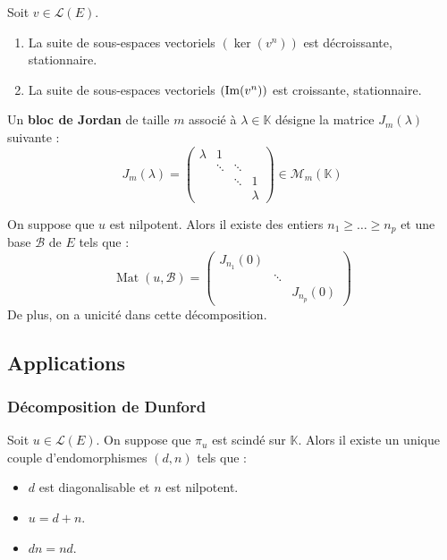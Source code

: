  \begin{proposition}
    Soit $v \in \mathcal{L}(E)$.
    \begin{enumerate}[label={\bfseries(\roman*)}]
      \item La suite de sous-espaces vectoriels $(\ker(v^n))$ est décroissante, stationnaire.
      \item La suite de sous-espaces vectoriels $(\mathrm{Im}(v^n))$ est croissante, stationnaire.
    \end{enumerate}
  \end{proposition}


  \begin{definition}
    Un \textbf{bloc de Jordan} de taille $m$ associé à $\lambda \in \mathbb{K}$ désigne la matrice $J_m(\lambda)$ suivante :
    \[ J_m(\lambda) = \begin{pmatrix} \lambda & 1 & \\ & \ddots & \ddots & \\ & & \ddots & 1 \\ & & & \lambda \end{pmatrix} \in \mathcal{M}_m(\mathbb{K}) \]
  \end{definition}

  \begin{application}
    On suppose que $u$ est nilpotent. Alors il existe des entiers $n_1 \geq \dots \geq n_p$ et une base $\mathcal{B}$ de $E$ tels que :
    \[ \operatorname{Mat}(u, \mathcal{B}) = \begin{pmatrix} J_{n_1}(0) & & \\ & \ddots & \\ & & J_{n_p}(0) \end{pmatrix} \]
    De plus, on a unicité dans cette décomposition.
  \end{application}

  \subsection{Applications}

  \subsubsection{Décomposition de Dunford}


  \begin{theorem}
    Soit $u \in \mathcal{L}(E)$. On suppose que $\pi_u$ est scindé sur $\mathbb{K}$. Alors il existe un unique couple d'endomorphismes $(d, n)$ tels que :
    \begin{itemize}
      \item $d$ est diagonalisable et $n$ est nilpotent.
      \item $u = d + n$.
      \item $d n = n d$.
    \end{itemize}
  \end{theorem}

